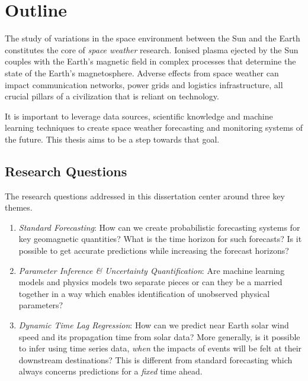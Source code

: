 \chapter{Outline}\label{chapter:Outline}

The study of variations in the space environment between the Sun and the Earth constitutes 
the core of \textit{space weather} research. Ionised plasma ejected by the Sun couples with 
the Earth’s magnetic field in complex processes that determine the state of the Earth's 
magnetosphere. Adverse effects from space weather can impact communication networks, 
power grids and logistics infrastructure, all crucial pillars of a civilization that 
is reliant on technology.

It is important to leverage data sources, scientific knowledge and machine learning 
techniques to create space weather forecasting and monitoring systems of the future. This 
thesis aims to be a step towards that goal. 

\section{Research Questions}

The research questions addressed in this dissertation center around three key themes.

\begin{enumerate}
    \item \textit{Standard Forecasting}: How can we create probabilistic forecasting systems 
    for key geomagnetic quantities? What is the time horizon for such forecasts? Is it possible 
    to get accurate predictions while increasing the forecast horizons?
    
    \item \textit{Parameter Inference \& Uncertainty Quantification}: Are machine learning models 
    and physics models two separate pieces or can they be a married together in a way which enables 
    identification of unobserved physical parameters?  
    
    \item \textit{Dynamic Time Lag Regression}: How can we predict near Earth solar wind speed 
    and its propagation time from solar data? More generally, is it possible to infer using time series 
    data, \emph{when} the impacts of events will be felt at their downstream destinations? This is different 
    from standard forecasting which always concerns predictions for a \emph{fixed} time ahead.
\end{enumerate}
    
